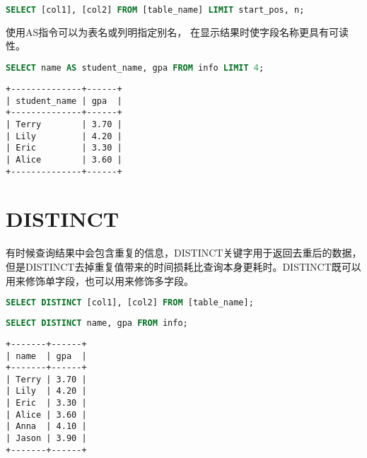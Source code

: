 \documentclass[12pt, openany, oneside]{book}
\begin{document}
\begin{lstlisting}[language=SQL]
SELECT [col1], [col2] FROM [table_name] LIMIT start_pos, n;
\end{lstlisting}

使用AS指令可以为表名或列明指定别名， 在显示结果时使字段名称更具有可读性。\\


\begin{lstlisting}[language=SQL]
SELECT name AS student_name, gpa FROM info LIMIT 4;
\end{lstlisting}

\begin{tcolorbox}
	\begin{verbatim}
+--------------+------+
| student_name | gpa  |
+--------------+------+
| Terry        | 3.70 |
| Lily         | 4.20 |
| Eric         | 3.30 |
| Alice        | 3.60 |
+--------------+------+
\end{verbatim}
\end{tcolorbox}

\vspace{0.5cm}

\section{DISTINCT}

有时候查询结果中会包含重复的信息，DISTINCT关键字用于返回去重后的数据，但是DISTINCT去掉重复值带来的时间损耗比查询本身更耗时。DISTINCT既可以用来修饰单字段，也可以用来修饰多字段。

\vspace{-0.5cm}

\begin{lstlisting}[language=SQL]
SELECT DISTINCT [col1], [col2] FROM [table_name];
\end{lstlisting}

\vspace{0.5cm}


\begin{lstlisting}[language=SQL]
SELECT DISTINCT name, gpa FROM info;
\end{lstlisting}

\begin{tcolorbox}
	\begin{verbatim}
+-------+------+
| name  | gpa  |
+-------+------+
| Terry | 3.70 |
| Lily  | 4.20 |
| Eric  | 3.30 |
| Alice | 3.60 |
| Anna  | 4.10 |
| Jason | 3.90 |
+-------+------+
\end{verbatim}
\end{tcolorbox}
\end{document}
